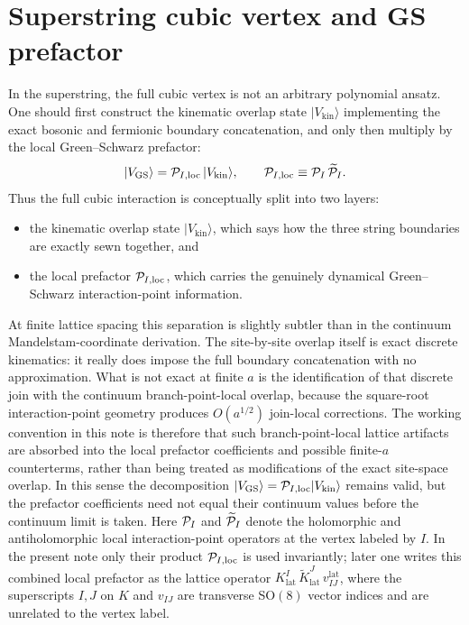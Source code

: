 \documentclass[11pt]{article}
\numberwithin{equation}{section}
\begin{document}
\section{Superstring cubic vertex and GS prefactor}
In the superstring, the full cubic vertex is not an arbitrary polynomial ansatz. One should first construct the kinematic overlap state $|V_{\mathrm{kin}}\rangle$ implementing the exact bosonic and fermionic boundary concatenation, and only then multiply by the local Green--Schwarz prefactor:
\begin{equation}
\label{eq:s14-001}
|V_{\mathrm{GS}}\rangle
=
{\cal P}_{I,\mathrm{loc}}\,|V_{\mathrm{kin}}\rangle,
\qquad
{\cal P}_{I,\mathrm{loc}}\equiv {\cal P}_I\,\widetilde{\cal P}_I.
\end{equation}
Thus the full cubic interaction is conceptually split into two layers:
\begin{itemize}
\item the kinematic overlap state $|V_{\mathrm{kin}}\rangle$, which says how the three string boundaries are exactly sewn together, and
\item the local prefactor ${\cal P}_{I,\mathrm{loc}}$, which carries the genuinely dynamical Green--Schwarz interaction-point information.
\end{itemize}
At finite lattice spacing this separation is slightly subtler than in the continuum Mandelstam-coordinate derivation. The site-by-site overlap itself is exact discrete kinematics: it really does impose the full boundary concatenation with no approximation. What is not exact at finite $a$ is the identification of that discrete join with the continuum branch-point-local overlap, because the square-root interaction-point geometry produces $O(a^{1/2})$ join-local corrections. The working convention in this note is therefore that such branch-point-local lattice artifacts are absorbed into the local prefactor coefficients and possible finite-$a$ counterterms, rather than being treated as modifications of the exact site-space overlap. In this sense the decomposition $|V_{\mathrm{GS}}\rangle={\cal P}_{I,\mathrm{loc}}|V_{\mathrm{kin}}\rangle$ remains valid, but the prefactor coefficients need not equal their continuum values before the continuum limit is taken.
Here ${\cal P}_I$ and $\widetilde{\cal P}_I$ denote the holomorphic and antiholomorphic local interaction-point operators at the vertex labeled by $I$. In the present note only their product ${\cal P}_{I,\mathrm{loc}}$ is used invariantly; later one writes this combined local prefactor as the lattice operator $K_{\mathrm{lat}}^I\,\widetilde K_{\mathrm{lat}}^J\,v^{\mathrm{lat}}_{IJ}$, where the superscripts $I,J$ on $K$ and $v_{IJ}$ are transverse SO$(8)$ vector indices and are unrelated to the vertex label.
\end{document}
